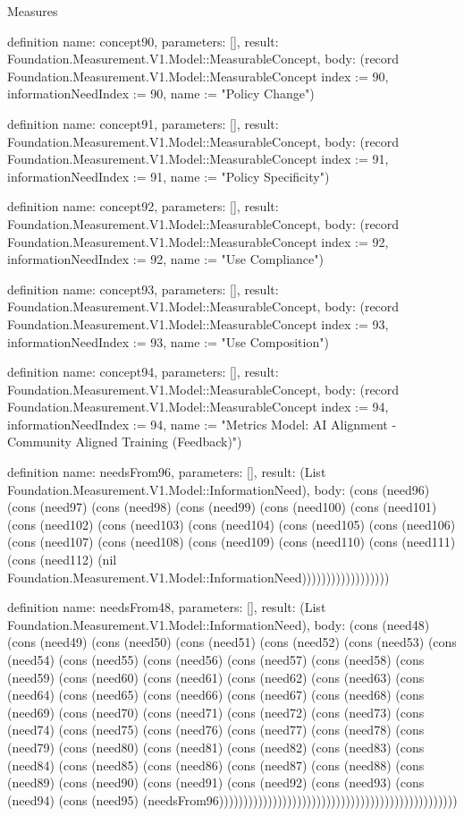 \begin{lexlean}{Measures}
\begin{semanticmodule}
definition{
  name: concept90,
  parameters: [],
  result: Foundation.Measurement.V1.Model::MeasurableConcept,
  body: (record Foundation.Measurement.V1.Model::MeasurableConcept {index := 90, informationNeedIndex := 90, name := "Policy Change"})
}

definition{
  name: concept91,
  parameters: [],
  result: Foundation.Measurement.V1.Model::MeasurableConcept,
  body: (record Foundation.Measurement.V1.Model::MeasurableConcept {index := 91, informationNeedIndex := 91, name := "Policy Specificity"})
}

definition{
  name: concept92,
  parameters: [],
  result: Foundation.Measurement.V1.Model::MeasurableConcept,
  body: (record Foundation.Measurement.V1.Model::MeasurableConcept {index := 92, informationNeedIndex := 92, name := "Use Compliance"})
}

definition{
  name: concept93,
  parameters: [],
  result: Foundation.Measurement.V1.Model::MeasurableConcept,
  body: (record Foundation.Measurement.V1.Model::MeasurableConcept {index := 93, informationNeedIndex := 93, name := "Use Composition"})
}

definition{
  name: concept94,
  parameters: [],
  result: Foundation.Measurement.V1.Model::MeasurableConcept,
  body: (record Foundation.Measurement.V1.Model::MeasurableConcept {index := 94, informationNeedIndex := 94, name := "Metrics Model: AI Alignment - Community Aligned Training (Feedback)"})
}

definition{
  name: needsFrom96,
  parameters: [],
  result: (List Foundation.Measurement.V1.Model::InformationNeed),
  body: (cons (need96) (cons (need97) (cons (need98) (cons (need99) (cons (need100) (cons (need101) (cons (need102) (cons (need103) (cons (need104) (cons (need105) (cons (need106) (cons (need107) (cons (need108) (cons (need109) (cons (need110) (cons (need111) (cons (need112) (nil Foundation.Measurement.V1.Model::InformationNeed))))))))))))))))))
}

definition{
  name: needsFrom48,
  parameters: [],
  result: (List Foundation.Measurement.V1.Model::InformationNeed),
  body: (cons (need48) (cons (need49) (cons (need50) (cons (need51) (cons (need52) (cons (need53) (cons (need54) (cons (need55) (cons (need56) (cons (need57) (cons (need58) (cons (need59) (cons (need60) (cons (need61) (cons (need62) (cons (need63) (cons (need64) (cons (need65) (cons (need66) (cons (need67) (cons (need68) (cons (need69) (cons (need70) (cons (need71) (cons (need72) (cons (need73) (cons (need74) (cons (need75) (cons (need76) (cons (need77) (cons (need78) (cons (need79) (cons (need80) (cons (need81) (cons (need82) (cons (need83) (cons (need84) (cons (need85) (cons (need86) (cons (need87) (cons (need88) (cons (need89) (cons (need90) (cons (need91) (cons (need92) (cons (need93) (cons (need94) (cons (need95) (needsFrom96)))))))))))))))))))))))))))))))))))))))))))))))))
}


\end{semanticmodule}
\end{lexlean}
